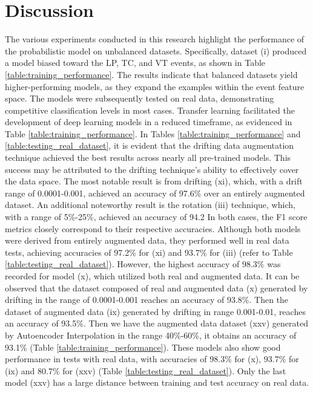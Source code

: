 \documentclass[journal]{IEEEtran}
\begin{document}
\section{Discussion}\label{discussion}
The various experiments conducted in this research highlight the performance of the probabilistic model on unbalanced datasets. Specifically, dataset (i) produced a model biased toward the LP, TC, and VT events, as shown in Table \ref{table:training_performance}.
The results indicate that balanced datasets yield higher-performing models, as they expand the examples within the event feature space. The models were subsequently tested on real data, demonstrating competitive classification levels in most cases. Transfer learning facilitated the development of deep learning models in a reduced timeframe, as evidenced in Table \ref{table:training_performance}.
In Tables \ref{table:training_performance} and \ref{table:testing_real_dataset}, it is evident that the drifting data augmentation technique achieved the best results across nearly all pre-trained models. This success may be attributed to the drifting technique's ability to effectively cover the data space. The most notable result is from drifting (xi), which, with a drift range of 0.0001-0.001, achieved an accuracy of 97.6\% over an entirely augmented dataset. An additional noteworthy result is the rotation (iii) technique, which, with a range of 5\%-25\%, achieved an accuracy of 94.2%
In both cases, the F1 score metrics closely correspond to their respective accuracies. Although both models were derived from entirely augmented data, they performed well in real data tests, achieving accuracies of 97.2\% for (xi) and 93.7\% for (iii) (refer to Table \ref{table:testing_real_dataset}). However, the highest accuracy of 98.3\% was recorded for model (x), which utilized both real and augmented data.
It can be observed that the dataset composed of real and augmented data (x) generated by drifting in the range of 0.0001-0.001 reaches an accuracy of 93.8\%. Then the dataset of augmented data (ix) generated by drifting in range 0.001-0.01, reaches an accuracy of 93.5\%. Then we have the augmented data dataset (xxv) generated by Autoencoder Interpolation in the range 40\%-60\%, it obtains an accuracy of 93.1\% (Table \ref{table:training_performance}). These models also show good performance in tests with real data, with accuracies of 98.3\% for (x), 93.7\% for (ix) and 80.7\% for (xxv) (Table \ref{table:testing_real_dataset}). Only the last model (xxv) has a large distance between training and test accuracy on real data.
\end{document}
